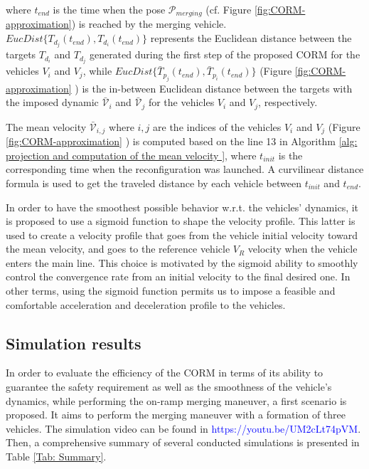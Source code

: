 \begin{enumerate}
where $t_{end}$ is the time when the pose $\mathcal{P}_{merging}$ (cf. Figure \ref{fig:CORM-approximation}) is reached by the merging vehicle. $EucDist \{T_{d_j}(t_{end}),{T}_{d_i}(t_{end})\}$  represents the Euclidean distance between the targets $T_{d_{i}}$ and $T_{d_j}$ generated during the first step of the proposed CORM for the vehicles $V_i$ and $V_j$, while $EucDist \{\bar{T}_{p_j}(t_{end}),\bar{T}_{p_i}(t_{end})\}$ (Figure \ref{fig:CORM-approximation} ) is the in-between Euclidean distance between the targets with the imposed dynamic $\bar{\mathcal{V}}_{i}$  and  $\bar{\mathcal{V}}_{j}$ for the vehicles $V_i$ and $V_j$, respectively.  



The mean velocity $\bar{\mathcal{V}}_{i,j}$ where $i,j$ are the indices of the vehicles $V_i$ and $V_j$ (Figure \ref{fig:CORM-approximation} ) is computed based on the line 13 in Algorithm \ref{alg: projection and computation of the mean velocity }, where $t_{init}$ is the corresponding time when the reconfiguration was launched. A curvilinear distance formula is used to get the traveled distance by each vehicle between $t_{init}$ and $t_{end}$. 




In order to have the smoothest possible behavior w.r.t. the vehicles' dynamics, it is proposed to use a sigmoid function to shape the velocity profile. This latter is used to create a velocity profile that goes from the vehicle initial velocity toward the mean velocity, and goes to the reference vehicle $V_R$ velocity when the vehicle enters the main line. This choice is motivated by the sigmoid ability to smoothly control the convergence rate from an initial velocity to the final desired one. In other terms, using the sigmoid function permits us to impose a feasible and comfortable acceleration and deceleration profile to the vehicles. 








    
\end{enumerate}


\subsection{Simulation results}\label{sec:CORM_simulation}

In order to evaluate the efficiency of the CORM in terms of its ability to guarantee the safety requirement as well as the smoothness of the vehicle's dynamics, while performing the on-ramp merging maneuver, a first scenario is proposed. It aims to perform the merging maneuver with a formation of three vehicles. The simulation video can be found in \textcolor{blue}{https://youtu.be/UM2cLt74pVM}. Then, a comprehensive summary of several conducted simulations is presented in Table \ref{Tab: Summary}. 

